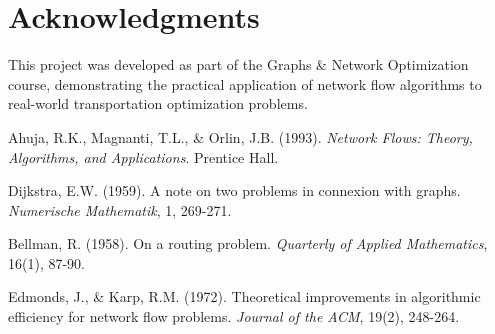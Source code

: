 \documentclass[12pt,a4paper]{article}
\begin{document}
\section*{Acknowledgments}

This project was developed as part of the Graphs \& Network Optimization course, demonstrating the practical application of network flow algorithms to real-world transportation optimization problems.


\begin{thebibliography}{9}

Ahuja, R.K., Magnanti, T.L., \& Orlin, J.B. (1993). \textit{Network Flows: Theory, Algorithms, and Applications}. Prentice Hall.

Dijkstra, E.W. (1959). A note on two problems in connexion with graphs. \textit{Numerische Mathematik}, 1, 269-271.

Bellman, R. (1958). On a routing problem. \textit{Quarterly of Applied Mathematics}, 16(1), 87-90.

Edmonds, J., \& Karp, R.M. (1972). Theoretical improvements in algorithmic efficiency for network flow problems. \textit{Journal of the ACM}, 19(2), 248-264.

\end{thebibliography}
\end{document}
